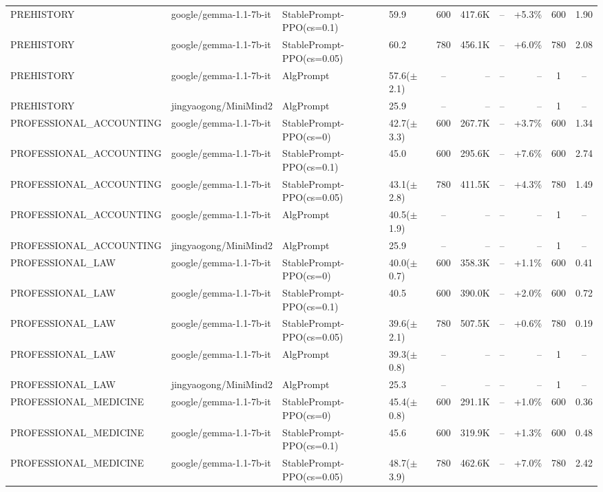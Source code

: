 {\begin{longtable}{@{}p{5.5cm}p{4.5cm}p{2.5cm}lcrrrcc@{}}
PREHISTORY & google/gemma-1.1-7b-it & StablePrompt-PPO(cs=0.1) & 59.9 & 600 & 417.6K & -- & +5.3\% & 600 & 1.90 \\
PREHISTORY & google/gemma-1.1-7b-it & StablePrompt-PPO(cs=0.05) & 60.2 & 780 & 456.1K & -- & +6.0\% & 780 & 2.08 \\
PREHISTORY & google/gemma-1.1-7b-it & AlgPrompt & 57.6($\pm$2.1) & -- & -- & -- & -- & 1 & -- \\
\midrule
PREHISTORY & jingyaogong/MiniMind2 & AlgPrompt & 25.9 & -- & -- & -- & -- & 1 & -- \\
\midrule
PROFESSIONAL\_ACCOUNTING & google/gemma-1.1-7b-it & StablePrompt-PPO(cs=0) & 42.7($\pm$3.3) & 600 & 267.7K & -- & +3.7\% & 600 & 1.34 \\
PROFESSIONAL\_ACCOUNTING & google/gemma-1.1-7b-it & StablePrompt-PPO(cs=0.1) & 45.0 & 600 & 295.6K & -- & +7.6\% & 600 & 2.74 \\
PROFESSIONAL\_ACCOUNTING & google/gemma-1.1-7b-it & StablePrompt-PPO(cs=0.05) & 43.1($\pm$2.8) & 780 & 411.5K & -- & +4.3\% & 780 & 1.49 \\
PROFESSIONAL\_ACCOUNTING & google/gemma-1.1-7b-it & AlgPrompt & 40.5($\pm$1.9) & -- & -- & -- & -- & 1 & -- \\
\midrule
PROFESSIONAL\_ACCOUNTING & jingyaogong/MiniMind2 & AlgPrompt & 25.9 & -- & -- & -- & -- & 1 & -- \\
\midrule
PROFESSIONAL\_LAW & google/gemma-1.1-7b-it & StablePrompt-PPO(cs=0) & 40.0($\pm$0.7) & 600 & 358.3K & -- & +1.1\% & 600 & 0.41 \\
PROFESSIONAL\_LAW & google/gemma-1.1-7b-it & StablePrompt-PPO(cs=0.1) & 40.5 & 600 & 390.0K & -- & +2.0\% & 600 & 0.72 \\
PROFESSIONAL\_LAW & google/gemma-1.1-7b-it & StablePrompt-PPO(cs=0.05) & 39.6($\pm$2.1) & 780 & 507.5K & -- & +0.6\% & 780 & 0.19 \\
PROFESSIONAL\_LAW & google/gemma-1.1-7b-it & AlgPrompt & 39.3($\pm$0.8) & -- & -- & -- & -- & 1 & -- \\
\midrule
PROFESSIONAL\_LAW & jingyaogong/MiniMind2 & AlgPrompt & 25.3 & -- & -- & -- & -- & 1 & -- \\
\midrule
PROFESSIONAL\_MEDICINE & google/gemma-1.1-7b-it & StablePrompt-PPO(cs=0) & 45.4($\pm$0.8) & 600 & 291.1K & -- & +1.0\% & 600 & 0.36 \\
PROFESSIONAL\_MEDICINE & google/gemma-1.1-7b-it & StablePrompt-PPO(cs=0.1) & 45.6 & 600 & 319.9K & -- & +1.3\% & 600 & 0.48 \\
PROFESSIONAL\_MEDICINE & google/gemma-1.1-7b-it & StablePrompt-PPO(cs=0.05) & 48.7($\pm$3.9) & 780 & 462.6K & -- & +7.0\% & 780 & 2.42 \\

\end{longtable}}

